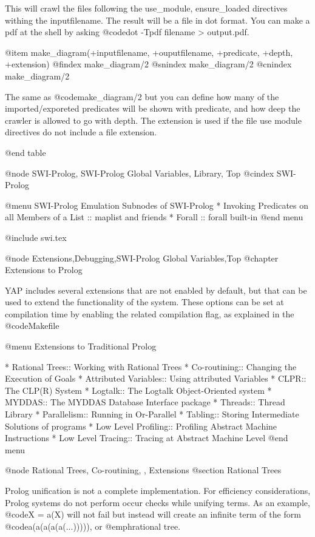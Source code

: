 {{{{{{{{{This will crawl the files following the use_module, ensure_loaded directives withing the inputfilename.
The result will be a file in dot format.
You can make a pdf at the shell by asking @code{dot -Tpdf filename > output.pdf}.

@item make_diagram(+inputfilename, +ouputfilename, +predicate, +depth, +extension)
@findex make_diagram/2
@snindex make_diagram/2
@cnindex make_diagram/2

The same as @code{make_diagram/2} but you can define how many of the imported/exporeted predicates will be shown with predicate, and how deep the crawler is allowed to go with depth. The extension is used if the file use module directives do not include a file extension.

@end table


@node SWI-Prolog, SWI-Prolog Global Variables, Library, Top
@cindex SWI-Prolog

@menu SWI-Prolog Emulation
Subnodes of SWI-Prolog
* Invoking Predicates on all Members of a List :: maplist and friends
* Forall :: forall built-in
@end menu

@include swi.tex

@node Extensions,Debugging,SWI-Prolog Global Variables,Top 
@chapter Extensions to Prolog

YAP includes several extensions that are not enabled by
default, but that can be used to extend the functionality of the
system. These options can be set at compilation time by enabling the
related compilation flag, as explained in the @code{Makefile}

@menu
Extensions to Traditional Prolog

* Rational Trees:: Working with Rational Trees
* Co-routining:: Changing the Execution of Goals
* Attributed Variables:: Using attributed Variables
* CLPR:: The CLP(R) System
* Logtalk:: The Logtalk Object-Oriented system
* MYDDAS:: The MYDDAS Database Interface package
* Threads:: Thread Library
* Parallelism:: Running in Or-Parallel
* Tabling:: Storing Intermediate Solutions of programs 
* Low Level Profiling:: Profiling Abstract Machine Instructions
* Low Level Tracing:: Tracing at Abstract Machine Level
@end menu

@node Rational Trees, Co-routining, , Extensions
@section Rational Trees

Prolog unification is not a complete implementation. For efficiency
considerations, Prolog systems do not perform occur checks while
unifying terms. As an example, @code{X = a(X)} will not fail but instead
will create an infinite term of the form @code{a(a(a(a(a(...)))))}, or
@emph{rational tree}.

}}}}}}}}}
